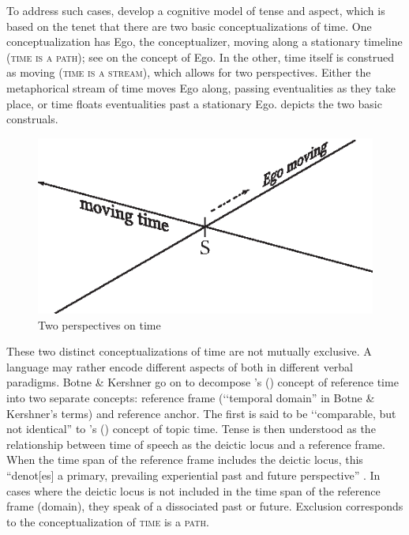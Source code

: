 To address such cases, \citet{BotneRKershnerT2008} develop a cognitive model of tense and aspect, which is based on the tenet that there are two basic conceptualizations of time. One conceptualization has Ego, the conceptualizer, moving along a stationary timeline (\textsc{time is a path}); see \citet[84f]{EvansVGreenM2006} on the concept of Ego. In the other, time itself is construed as moving (\textsc{time is a stream}), which allows for two perspectives. Either the metaphorical stream of time moves Ego along, passing eventualities as they take place, or time floats eventualities past a stationary Ego.  depicts the two basic construals.

\begin{figure}[h]
\begin{center}
\includegraphics{figures/GrafikPerspectivesTime.eps}
\caption{Two perspectives on time}
\label{FigurePerspectivesOnTime}
\end{center}
\end{figure}

These two distinct conceptualizations of time are not mutually exclusive. A language may rather encode different aspects of both in different verbal paradigms. Botne \& Kershner go on to decompose \citeauthor{ReichenbachH1947}'s (\citeyear{ReichenbachH1947}) concept of reference time into two separate concepts: reference frame (\lq\lq temporal domain'' in Botne \& Kershner's terms) and reference anchor. The first is said to be \lq\lq comparable, but not identical'' \citep[152]{BotneRKershnerT2008} to \citeauthor{KleinW1994}'s (\citeyear{KleinW1994}) concept of topic time. Tense is then understood as the relationship between time of speech as the deictic locus and a reference frame. When the time span of the reference frame includes the deictic locus, this ``denot[es] a primary, prevailing experiential past and future perspective'' \citep[153]{BotneRKershnerT2008}. In cases where the deictic locus is not included in the time span of the reference frame (domain), they speak of a dissociated past or future. Exclusion corresponds to the conceptualization of \textsc{time} is a \textsc{path}.

